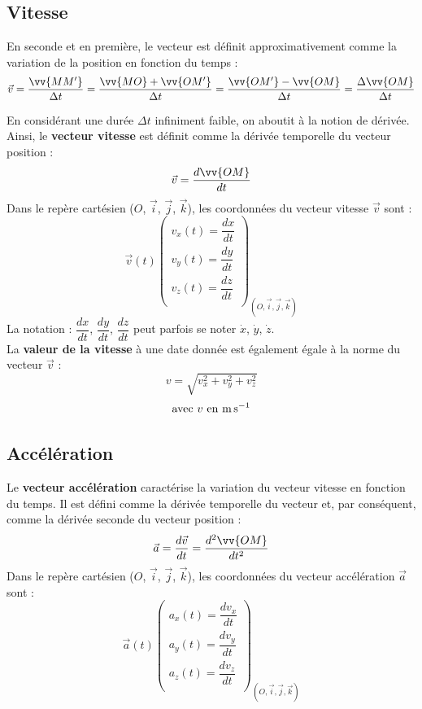 \documentclass[a4paper,11pt,fleqn]{article}%
\begin{document}
	\subsection{Vitesse}
En seconde et en première, le vecteur est définit approximativement comme la variation de la position en fonction du temps :
$$\vec{v} = \dfrac{\vv{MM'}}{\Delta t} = \dfrac{\vv{MO} + \vv{OM'}}{\Delta t} = \dfrac{\vv{OM'} - \vv{OM}}{\Delta t} = \dfrac{\Delta \vv{OM}}{\Delta t} $$

En considérant une durée $\Delta t$ infiniment faible, on aboutit à la notion de dérivée. Ainsi, le \textbf{vecteur vitesse} est définit comme la dérivée temporelle du vecteur position :
$$\vec{v} = \dfrac{d\vv{OM}}{dt}$$
Dans le repère cartésien ($O$, $\vec{i}$, $\vec{j}$, $\vec{k}$), les coordonnées du vecteur vitesse $\vec{v}$ sont :
$$\vec{v}(t)
	\left( 
	\begin{array}{l} v_x(t)=\dfrac{dx}{dt} \\ v_y(t)=\dfrac{dy}{dt} \\ v_z(t)=\dfrac{dz}{dt} \\ 
	\end{array} 
	\right) _{(O, \vec{i}, \vec{j}, \vec{k})}$$
La notation : $\dfrac{dx}{dt}$, $\dfrac{dy}{dt}$, $\dfrac{dz}{dt}$ peut parfois se noter $\dot{x}$, $\dot{y}$, $\dot{z}$.\\

La \textbf{valeur de la vitesse} à une date donnée est également égale à la norme du vecteur $\vec{v}$ :
$$v=\sqrt{v_x^2 + v_y^2 + v_z^2}$$
$$\text{avec } v \text{ en \unit{\meter\per\second}}$$ 

	\subsection{Accélération}
Le \textbf{vecteur accélération} caractérise la variation du vecteur vitesse en fonction du temps. Il est défini comme la dérivée temporelle du vecteur et, par conséquent, comme la dérivée seconde du vecteur position :
$$ \vec{a} = \dfrac{d\vec{v}}{dt} = \dfrac{d^2\vv{OM}}{dt^2}$$
Dans le repère cartésien ($O$, $\vec{i}$, $\vec{j}$, $\vec{k}$), les coordonnées du vecteur accélération $\vec{a}$ sont :
$$\vec{a}(t)
	\left(
	\begin{array}{l}
	a_x(t) = \dfrac{dv_x}{dt} \\ a_y(t) = \dfrac{dv_y}{dt} \\ a_z(t) = \dfrac{dv_z}{dt}\\
	\end{array}
	\right)_{(O, \vec{i}, \vec{j}, \vec{k})}$$
\end{document}

